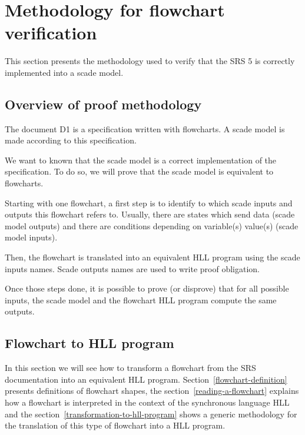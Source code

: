 \section{Methodology for flowchart verification}
\label{methodology}
This section presents the methodology used to verify that the SRS 5 is
correctly implemented into a scade model.

\subsection{Overview of proof methodology}
\label{overview}
The document D1 is a specification written with flowcharts. A scade
model is made according to this specification.

We want to known that the scade model is a correct implementation of
the specification. To do so, we will prove that the scade model
is equivalent to flowcharts.


Starting with one flowchart, a first step is to identify to which
scade inputs and outputs this flowchart refers to. Usually, there are
states which send data (scade model outputs) and there are conditions
depending on variable(s) value(s) (scade model inputs).

Then, the flowchart is translated into an equivalent HLL program using
the scade inputs names. Scade outputs names are used to write proof
obligation.

Once those steps done, it is possible to prove (or disprove) that for
all possible inputs, the scade model and the flowchart HLL program
compute the same outputs.


\subsection{Flowchart to HLL program}
\label{flowchart-2-hll}
In this section we will see how to transform a flowchart from the SRS
documentation into an equivalent HLL
program. Section~\ref{flowchart-definition} presents definitions of
flowchart shapes, the section~\ref{reading-a-flowchart} explains how a
flowchart is interpreted in the context of the synchronous language
HLL and the section~\ref{transformation-to-hll-program} shows a
generic methodology for the translation of this type of flowchart into
a HLL program.
